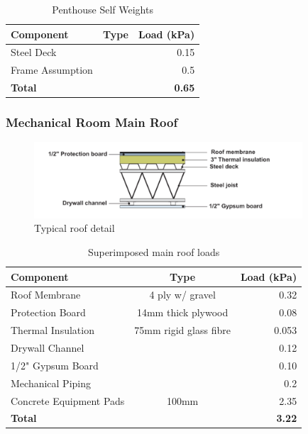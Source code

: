 \documentclass[12pt]{article}
\begin{document}
    \begin{table}[h!]
        \centering
        \caption{Penthouse Self Weights}
        \label{tab:selfPent}
    \begin{tabular}{lcr}
        \toprule
        \textbf{Component} & \textbf{Type} & \textbf{Load (kPa)}\\
        \midrule
        Steel Deck & & 0.15\\
        Frame Assumption & & 0.5\\
        \textbf{Total} & & \textbf{0.65}\\
        \bottomrule
    \end{tabular}
    \end{table}

\subsubsection{Mechanical Room Main Roof}
\begin{figure}
    \centering
\includegraphics[width=10cm]{Assets/Roof_Structure.png}
\caption{Typical roof detail}
\label{fig:roofStruct}
\end{figure}

\begin{table}[h!]
    \centering
    \caption{Superimposed main roof loads}
    \label{tab:superMain}
    \begin{tabular}{lcr}
        \toprule
        \textbf{Component} & \textbf{Type} & \textbf{Load (kPa)}\\
        \midrule
        Roof Membrane & 4 ply w/ gravel & 0.32\\
        Protection Board & 14mm thick plywood & 0.08\\
        Thermal Insulation & 75mm rigid glass fibre & 0.053\\
        Drywall Channel &  & 0.12\\
        1/2" Gypsum Board &  & 0.10\\
        Mechanical Piping &  & 0.2\\
        Concrete Equipment Pads & 100mm & 2.35\\
        \textbf{Total} & & \textbf{3.22}\\
        \bottomrule
    \end{tabular}
\end{table}
\end{document}
